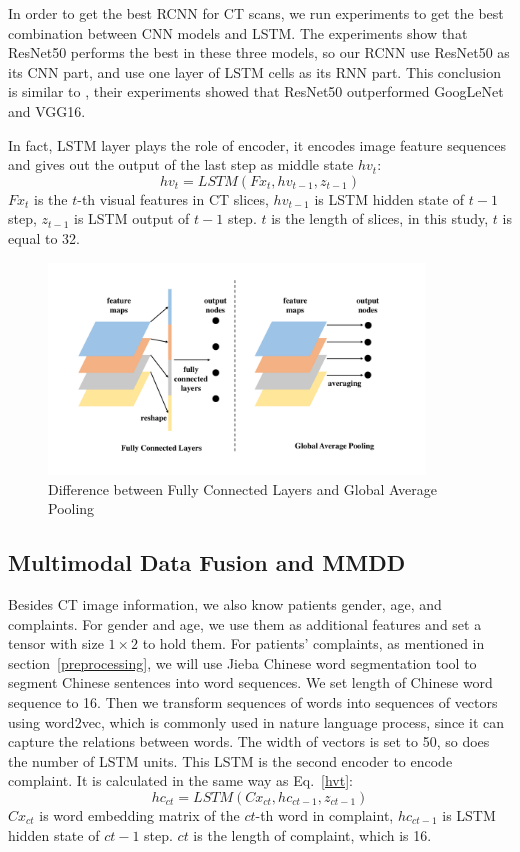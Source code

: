 \documentclass[runningheads]{llncs}
\begin{document}
In order to get the best RCNN for CT scans, we run experiments to get the best combination between CNN models and LSTM. The experiments show that ResNet50 performs the best in these three models, so our RCNN use ResNet50 as its CNN part, and use one layer of LSTM cells as its RNN part. This conclusion is similar to \cite{Wang2017ChestX}, their experiments showed that ResNet50 outperformed GoogLeNet and VGG16.

In fact, LSTM layer plays the role of encoder, it encodes image feature sequences and gives out the output of the last step as middle state $hv_t$:
\begin{equation}
hv_t = LSTM(Fx_t, hv_{t-1}, z_{t-1})
\label{hvt}
\end{equation}
$Fx_t$ is the $t$-th visual features in CT slices, $hv_{t-1}$ is LSTM hidden state of $t-1$ step, $z_{t-1}$ is LSTM output of $t-1$ step. $t$ is the length of slices, in this study, $t$ is equal to 32.

\begin{figure}[htb]
    \centerline{\includegraphics[width=100mm]{gap.pdf}}
    \vspace{-0cm}
    \caption{Difference between Fully Connected Layers and Global Average Pooling}
    \vspace{-0cm}
    \label{gap}
    \end{figure}


\subsection{Multimodal Data Fusion and MMDD}
\label{MMDD}
Besides CT image information, we also know patients gender, age, and complaints. For gender and age, we use them as additional features and set a tensor with size $1 \times 2$ to hold them. For patients' complaints, as mentioned in section~\ref{preprocessing}, we will use Jieba Chinese word segmentation tool to segment Chinese sentences into word sequences. We set length of Chinese word sequence to 16. Then we transform sequences of words into sequences of vectors using word2vec, which is commonly used in nature language process, since it can capture the relations between words. The width of vectors is set to 50, so does the number of LSTM units. This LSTM is the second encoder to encode complaint. It is calculated in the same way as Eq.~\ref{hvt}:
\begin{equation}
    hc_{ct} = LSTM(Cx_{ct}, hc_{ct-1}, z_{ct-1})
    \label{hct}
\end{equation}
$Cx_{ct}$ is word embedding matrix of the $ct$-th word in complaint, $hc_{ct-1}$ is LSTM hidden state of $ct-1$ step. $ct$ is the length of complaint, which is 16. 
\end{document}
